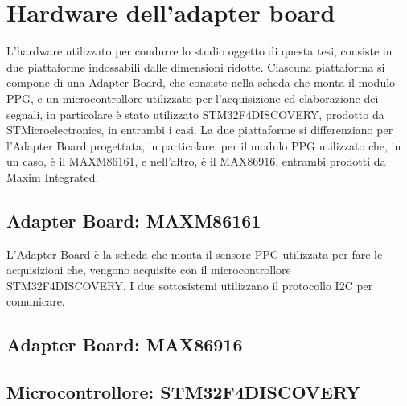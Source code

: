 \section{Hardware dell'adapter board}
L'hardware utilizzato per condurre lo studio oggetto di questa tesi, consiste in due piattaforme indossabili dalle dimensioni ridotte. Ciascuna piattaforma si compone di una Adapter Board, che consiste nella scheda che monta il modulo PPG, e un microcontrollore utilizzato per l'acquisizione ed elaborazione dei segnali, in particolare è stato utilizzato STM32F4DISCOVERY, prodotto da STMicroelectronics, in entrambi i casi.
La due piattaforme si differenziano per l'Adapter Board progettata, in particolare, per il modulo PPG utilizzato che, in un caso, è il MAXM86161, e nell'altro, è il MAX86916, entrambi prodotti da Maxim Integrated.
\subsection{Adapter Board: MAXM86161}
L'Adapter Board è la scheda che monta il sensore PPG utilizzata per fare le acquisizioni che, vengono acquisite con il microcontrollore STM32F4DISCOVERY. I due sottosistemi utilizzano il protocollo I2C per comunicare.

\subsection{Adapter Board: MAX86916}
\subsection{Microcontrollore: STM32F4DISCOVERY}